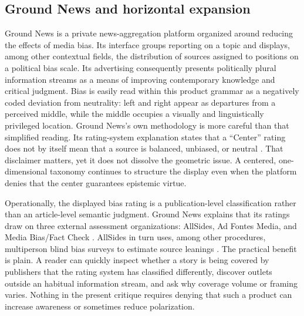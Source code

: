 \subsection{Ground News and horizontal expansion}

Ground News is a private news-aggregation platform organized around reducing the effects of media bias. Its interface groups reporting on a topic and displays, among other contextual fields, the distribution of sources assigned to positions on a political bias scale. Its advertising consequently presents politically plural information streams as a means of improving contemporary knowledge and critical judgment. Bias is easily read within this product grammar as a negatively coded deviation from neutrality: left and right appear as departures from a perceived middle, while the middle occupies a visually and linguistically privileged location. Ground News's own methodology is more careful than that simplified reading. Its rating-system explanation states that a ``Center'' rating does not by itself mean that a source is balanced, unbiased, or neutral \citep{groundnewsrating}. That disclaimer matters, yet it does not dissolve the geometric issue. A centered, one-dimensional taxonomy continues to structure the display even when the platform denies that the center guarantees epistemic virtue.

Operationally, the displayed bias rating is a publication-level classification rather than an article-level semantic judgment. Ground News explains that its ratings draw on three external assessment organizations: AllSides, Ad Fontes Media, and Media Bias/Fact Check \citep{groundnewsrating}. AllSides in turn uses, among other procedures, multiperson blind bias surveys to estimate source leanings \citep{allsidesmethod}. The practical benefit is plain. A reader can quickly inspect whether a story is being covered by publishers that the rating system has classified differently, discover outlets outside an habitual information stream, and ask why coverage volume or framing varies. Nothing in the present critique requires denying that such a product can increase awareness or sometimes reduce polarization.

